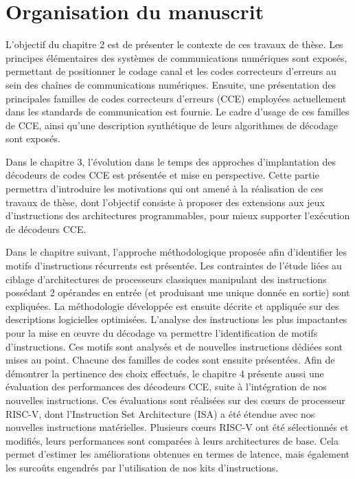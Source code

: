 \documentclass[../main.tex]{subfiles}
\begin{document}
\section*{Organisation du manuscrit}

L'objectif du chapitre 2 est de présenter le contexte de ces travaux de thèse.
Les principes élémentaires des systèmes de communications numériques sont exposés, permettant de positionner le codage canal et les codes correcteurs d’erreurs au sein des chaînes de communications numériques.
Ensuite, une présentation des principales familles de codes correcteurs d'erreurs (CCE) employées actuellement dans les standards de communication est fournie. Le cadre d’usage de ces familles de CCE, ainsi qu’une description synthétique de leurs algorithmes de décodage sont exposés.

Dans le chapitre 3, l’évolution dans le temps des approches d’implantation des décodeurs de codes CCE est présentée et mise en perspective.
Cette partie permettra d'introduire les motivations qui ont amené à la réalisation de ces travaux de thèse, dont l’objectif consiste à proposer des extensions aux jeux d’instructions des architectures programmables, pour mieux supporter l’exécution de décodeurs CCE.

Dans le chapitre suivant, l’approche méthodologique proposée afin d’identifier les motifs d’instructions récurrents est présentée.
Les contraintes de l’étude liées au ciblage d’architectures de processeurs classiques manipulant des instructions possédant 2 opérandes en entrée (et produisant une unique donnée en sortie) sont expliquées.
La méthodologie développée est ensuite décrite et appliquée sur des descriptions logicielles optimisées.
L'analyse des instructions les plus impactantes pour la mise en œuvre du décodage va permettre l’identification de motifs d’instructions.
Ces motifs sont analysés et de nouvelles instructions dédiées sont mises au point. Chacune des familles de codes sont ensuite présentées. Afin de démontrer la pertinence des choix effectués, le chapitre 4 présente aussi une évaluation des performances des décodeurs CCE, suite à l'intégration de nos nouvelles instructions. Ces évaluations sont réalisées sur des cœurs de processeur RISC-V, dont l'Instruction Set Architecture (ISA) a été étendue avec nos nouvelles instructions matérielles.
Plusieurs cœurs RISC-V ont été sélectionnés et modifiés, leurs performances sont comparées à leurs architectures de base.
Cela permet d’estimer les améliorations obtenues en termes de latence, mais également les surcoûts engendrés par l’utilisation de nos kits d'instructions.
 
\end{document}
